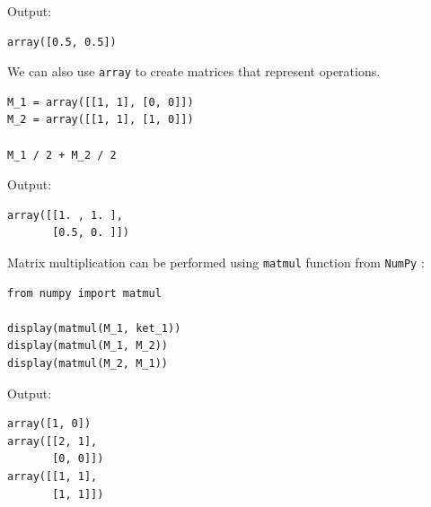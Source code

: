 \documentclass[svgnames]{article}     %
\begin{document}
Output:  

\begin{lstlisting}
array([0.5, 0.5])
\end{lstlisting} \vspace{5px}


We can also use \verb|array| to create matrices that represent operations.\\  

\begin{lstlisting}
M_1 = array([[1, 1], [0, 0]])
M_2 = array([[1, 1], [1, 0]])

M_1 / 2 + M_2 / 2
\end{lstlisting}

Output: 

\begin{lstlisting}
array([[1. , 1. ],
       [0.5, 0. ]])
\end{lstlisting} \vspace{5px}

Matrix multiplication can be performed using \verb|matmul| function from \verb|NumPy| : \\

\begin{lstlisting}
from numpy import matmul 

display(matmul(M_1, ket_1))
display(matmul(M_1, M_2))
display(matmul(M_2, M_1))
\end{lstlisting} \vspace{5px}

Output: 

\begin{lstlisting}
array([1, 0])
array([[2, 1], 
       [0, 0]])
array([[1, 1], 
       [1, 1]])
\end{lstlisting} \vspace{5px}
\end{document}
